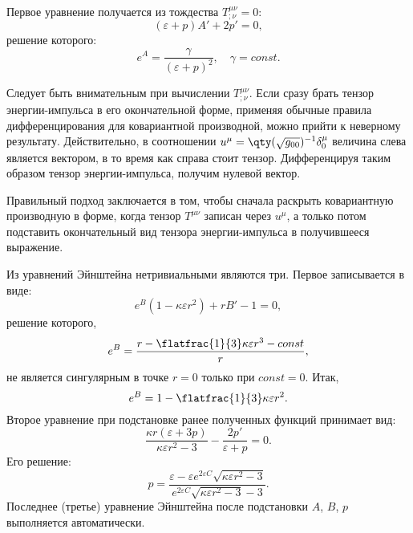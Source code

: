 \documentclass[\docroot/reports/draft/report.tex]{subfiles}
\begin{document}
    Первое уравнение получается из тождества $T^{\mu\nu}_{;\nu} = 0$:
    \begin{equation}
        (\varepsilon + p) A' + 2 p' = 0 ,
    \end{equation}
    решение которого:
    \begin{equation}
        e^{A} = \frac{\gamma}{(\varepsilon + p)^2} , \quad \gamma = const .
    \end{equation}

    \begin{footnotesize}
        Следует быть внимательным при вычислении $T^{\mu\nu}_{;\nu}$. Если сразу брать тензор энергии-импульса в его окончательной форме, применяя обычные правила дифференцирования для ковариантной производной, можно прийти к неверному результату. Действительно, в соотношении $u^\mu = \qty(\sqrt{g_{00}})^{-1} \delta^\mu_0$ величина слева является вектором, в то время как справа стоит тензор. Дифференцируя таким образом тензор энергии-импульса, получим нулевой вектор.

        Правильный подход заключается в том, чтобы сначала раскрыть ковариантную производную в форме, когда тензор $T^{\mu\nu}$ записан через $u^\mu$, а только потом подставить окончательный вид тензора энергии-импульса в получившееся выражение.
    \end{footnotesize}

    Из уравнений Эйнштейна нетривиальными являются три. Первое записывается в виде:
    \begin{equation}
        e^B (1 - \kappa \varepsilon r^2) + r B' - 1 = 0 ,
    \end{equation}
    решение которого,
    \begin{equation*}
        e^{B} = \frac{r - \flatfrac{1}{3} \kappa \varepsilon r^3 - const}{r} ,
    \end{equation*}
    не является сингулярным в точке $r = 0$ только при $const = 0$. Итак,
    \begin{equation*}
        e^{B} = 1 - \flatfrac{1}{3} \kappa \varepsilon r^2 .
    \end{equation*}
    Второе уравнение при подстановке ранее полученных функций принимает вид:
    \begin{equation}
        \frac{\kappa r (\varepsilon + 3 p)}{\kappa \varepsilon r^2 - 3} - \frac{2 p'}{\varepsilon + p} = 0 .
    \end{equation}
    Его решение:
    \begin{equation}
        p = \frac{\varepsilon - \varepsilon e^{2 \varepsilon C} \sqrt{\kappa \varepsilon r^2 - 3}}{e^{2 \varepsilon C} \sqrt{\kappa \varepsilon r^2 - 3} - 3} .
    \end{equation}
    Последнее (третье) уравнение Эйнштейна после подстановки $A$, $B$, $p$ выполняется автоматически.
\end{document}
